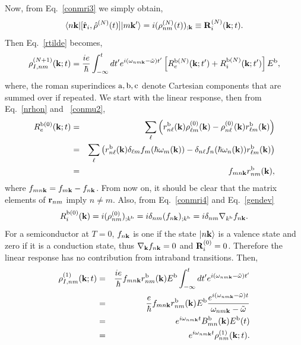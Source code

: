 \documentclass{article}
\begin{document}
 Now, from Eq.~\eqref{conmri3} we simply obtain,
\begin{equation}\label{conmri4}
\langle n\mathbf{k} |[\hat{\mathbf{r}}_i,\hat\rho^{(N)}(t)]| m\mathbf{k}' \rangle
=i(\rho^{(N)}_{nm}(t))_{;\mathbf{k}}
\equiv \mathbf{R}_i^{(N)}(\mathbf{k};t)
.
\end{equation}
Then Eq.~\eqref{rtilde} becomes,
\begin{equation}\label{rtilde2}
{\rho}^{(N+1)}_{I,nm}(\mathbf{k};t)
=\frac{ie}{\hbar}\int_{-\infty}^t dt'
e^{i(\omega_{nm\mathbf{k}}-\tilde\omega)t'}
\left[R_e^{\mathrm{b}(N)}(\mathbf{k};t')+R_i^{\mathrm{b}(N)}(\mathbf{k};t')\right]E^{\mathrm{b}}
,
\end{equation}
 where, the roman superindices
$\mathrm{a},\mathrm{b},\mathrm{c}$ denote Cartesian components that are summed over if repeated.
We start with the linear response, 
 then from Eq.~\eqref{nrhon} and ~\eqref{conmu2},
\begin{eqnarray}\label{R0e}
R_e^{\mathrm{b}(0)}(\mathbf{k};t)
&=&
\sum_{\ell}
\left(
r^{\mathrm{b}}_{n\ell}(\mathbf{k})
{\rho}^{(0)}_{\ell m}(\mathbf{k})
-
{\rho}^{(0)}_{n\ell}(\mathbf{k})
r^{\mathrm{b}}_{\ell m}(\mathbf{k})
\right)
\nonumber \\
&=&
\sum_{\ell}
\left(
r^{\mathrm{b}}_{n\ell}(\mathbf{k})
\delta_{\ell m}f_m(\hbar\omega_m(\mathbf{k}))
-
\delta_{n\ell}f_n(\hbar\omega_n(\mathbf{k}))
r^{\mathrm{b}}_{\ell m}(\mathbf{k})
\right)
\nonumber \\
&=&
f_{mn\mathbf{k}}
r^{\mathrm{b}}_{nm}(\mathbf{k})
,
\end{eqnarray}
where $f_{mn\mathbf{k}}=f_{m\mathbf{k}}-f_{n\mathbf{k}}$.
From now on,
  it should be clear that the matrix elements of $\mathbf{r}_{nm}$ imply
 $n\neq m$.
Also, from Eq.~\eqref{conmri4} and Eq.~\eqref{gendev}
\begin{equation}\label{R0i}
R_i^{\mathrm{b}(0)}(\mathbf{k})=i(\rho^{(0)}_{nm})_{;k^{\mathrm{b}}}=i\delta_{nm}(f_{n\mathbf{k}})_{;k^{\mathrm{b}}}=i\delta_{nm}\nabla_{k^{\mathrm{b}}} f_{n\mathbf{k}}
.
\end{equation}
For a semiconductor at $T=0$, $f_{n\mathbf{k}}$ is one if the state
$| n\mathbf{k} \rangle$ is a valence state and zero if it is a conduction state,
thus $\nabla_{\mathbf{k}} f_{n\mathbf{k}}=0$ and $\mathbf{R}_i^{(0)}=0$. 
Therefore
the linear response has no contribution from
intraband transitions.
 Then,
\begin{eqnarray}\label{rtilde2n}
{\rho}^{(1)}_{I,nm}(\mathbf{k};t)
&=&\frac{ie}{\hbar}
f_{mn\mathbf{k}}
r^{\mathrm{b}}_{nm}(\mathbf{k})E^{\mathrm{b}}
\int_{-\infty}^t dt'
e^{i(\omega_{nm\mathbf{k}}-\tilde\omega)t'}
\nonumber \\
&=&\frac{e}{\hbar}
f_{mn\mathbf{k}}
r^{\mathrm{b}}_{nm}(\mathbf{k})E^{\mathrm{b}}
\frac{e^{i(\omega_{nm\mathbf{k}}-\tilde\omega)t}}
{\omega_{nm\mathbf{k}}-\tilde\omega}
\nonumber \\
&=&
e^{i\omega_{nm\mathbf{k}}t}
B^{\mathrm{b}}_{mn}(\mathbf{k})E^{\mathrm{b}}(t)
\nonumber \\
&=&
e^{i\omega_{nm\mathbf{k}}t}
\rho^{(1)}_{nm}(\mathbf{k};t)
.
\end{eqnarray}
\end{document}

